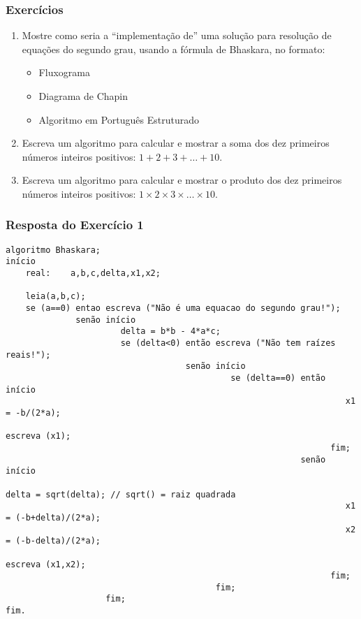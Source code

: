 \documentclass[aspectratio=169]{beamer}
\begin{document}
\begin{frame}\frametitle{Exercícios}
\begin{enumerate}
	\item Mostre como seria a ``implementação de'' uma solução para resolução de equações do segundo grau, usando a fórmula de Bhaskara, no formato:
	\begin{itemize}
		\item Fluxograma
		\item Diagrama de Chapin
		\item Algoritmo em Português Estruturado
	\end{itemize}
	\item Escreva um algoritmo para calcular e mostrar a soma dos dez primeiros números inteiros positivos: $1 + 2 + 3 + \ldots + 10$.
	\item Escreva um algoritmo para calcular e mostrar o produto dos dez primeiros números inteiros positivos: $1 \times 2 \times 3 \times \ldots \times 10$.
\end{enumerate}
\end{frame}

\begin{frame}[fragile]\frametitle{Resposta do Exercício 1}

{\tiny\begin{verbatim}
algoritmo Bhaskara;
início
    real:    a,b,c,delta,x1,x2;

    leia(a,b,c);
    se (a==0) entao escreva ("Não é uma equacao do segundo grau!");
              senão início
                       delta = b*b - 4*a*c;
                       se (delta<0) então escreva ("Não tem raízes reais!");
                                    senão início
                                             se (delta==0) então início
                                                                    x1 = -b/(2*a);
                                                                    escreva (x1);
                                                                 fim;
                                                           senão início
                                                                    delta = sqrt(delta); // sqrt() = raiz quadrada
                                                                    x1 = (-b+delta)/(2*a);
                                                                    x2 = (-b-delta)/(2*a);
                                                                    escreva (x1,x2);
                                                                 fim;
                                          fim;
                    fim;
fim.
\end{verbatim}}
\end{frame}
\end{document}

